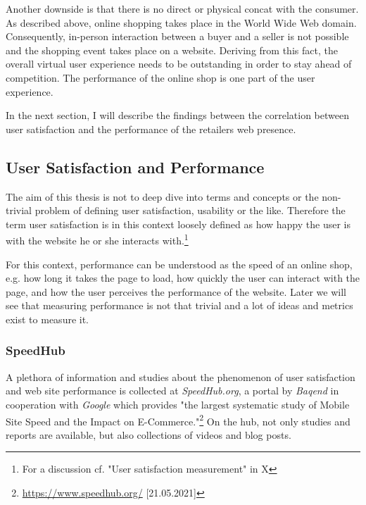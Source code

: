 Another downside is that there is no direct or physical concat with the consumer.
As described above, online shopping takes place in the World Wide Web domain.
Consequently, in-person interaction between a buyer and a seller is not possible and the shopping event takes place on a website.
Deriving from this fact, the overall virtual user experience needs to be outstanding in order to stay ahead of competition.
The performance of the online shop is one part of the user experience.

In the next section, I will describe the findings between the correlation between user satisfaction and the performance of the retailers web presence.





\subsection{User Satisfaction and Performance}

The aim of this thesis is not to deep dive into terms and concepts or the non-trivial problem of defining user satisfaction, usability or the like.
Therefore the term user satisfaction is in this context loosely defined as how happy the user is with the website he or she interacts with.\footnote{For a discussion cf. "User satisfaction measurement" in X} %

For this context, performance can be understood as the speed of an online shop, e.g. how long it takes the page to load, how quickly the user can interact with the page, and how the user perceives the performance of the website.
Later we will see that measuring performance is not that trivial and a lot of ideas and metrics exist to measure it.


\subsubsection{SpeedHub}


A plethora of information and studies about the phenomenon of user satisfaction and web site performance is collected at \textit{SpeedHub.org}, a portal by \textit{Baqend} in cooperation with \textit{Google} which provides "the largest systematic study of Mobile Site Speed and the Impact on E-Commerce."\footnote{\url{https://www.speedhub.org/} [21.05.2021]}
On the hub, not only studies and reports are available, but also collections of videos and blog posts.

